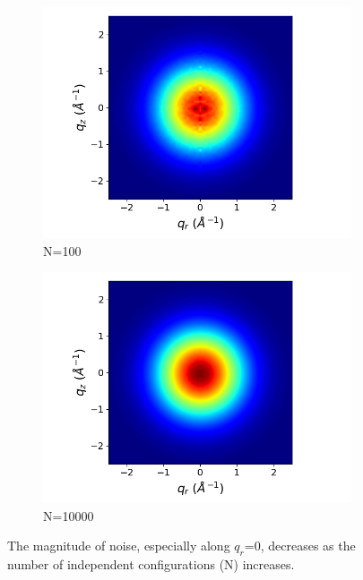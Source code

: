 \documentclass{article}
\begin{document}
\begin{figure}[!htb]
\begin{subfigure}{0.45\linewidth}
  \includegraphics[width=\textwidth]{xrd_100frame.png}
  \caption{N=100}
  \end{subfigure}
  \begin{subfigure}{0.45\linewidth}
  \centering
  \includegraphics[width=\textwidth]{xrd_10000frame.png}
  \caption{N=10000}
  \end{subfigure}
  \caption{The magnitude of noise, especially along $q_r$=0, decreases
  as the number of independent configurations (N) increases.}\label{fig:xrd_noise}
  \end{figure}
  
\end{document}
